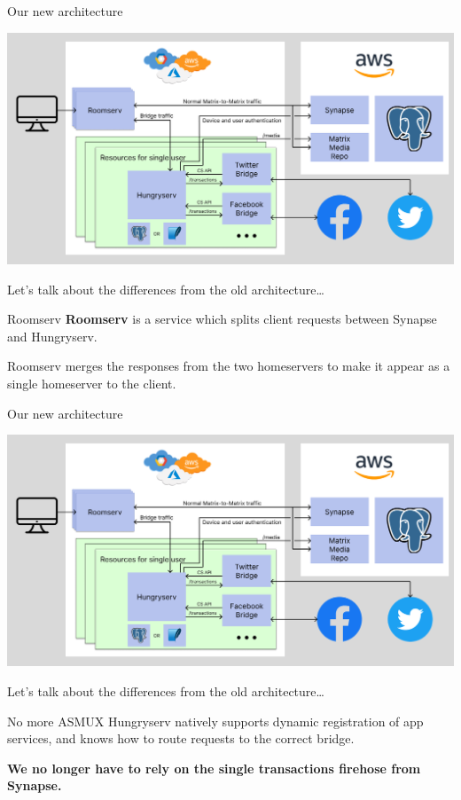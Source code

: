 \documentclass{beeper}
\begin{document}
\begin{frame}{Our new architecture}
    \centerline{\includegraphics[width=1.15\textwidth]{images/new-architecture}}

    Let's talk about the differences from the old architecture\ldots
\end{frame}

\begin{frame}{Roomserv}
    \textbf{Roomserv} is a service which splits client requests between Synapse
    and Hungryserv.

    Roomserv merges the responses from the two homeservers to make it appear as
    a single homeserver to the client.
\end{frame}

\begin{frame}{Our new architecture}
    \centerline{\includegraphics[width=1.15\textwidth]{images/new-architecture}}

    Let's talk about the differences from the old architecture\ldots
\end{frame}

\begin{frame}{No more ASMUX}
    Hungryserv natively supports dynamic registration of app services, and knows
    how to route requests to the correct bridge.
    \pause

    \textbf{We no longer have to rely on the single transactions firehose from
    Synapse.}
\end{frame}
\end{document}
